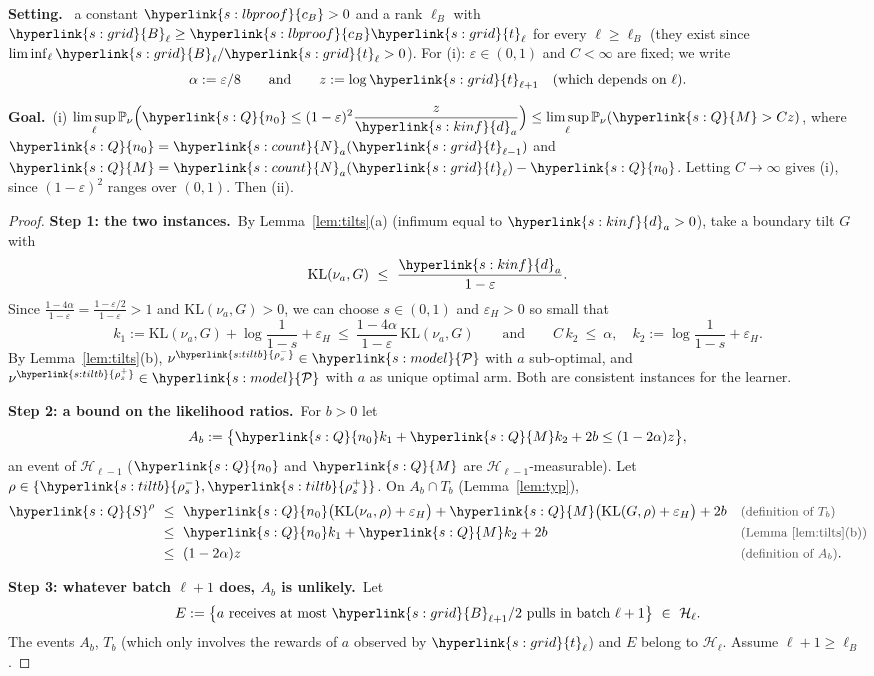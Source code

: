\documentclass[10pt]{article}
\newcommand{\dt}[1]{\hypertarget{#1}{}}
\newcommand{\sy}[2]{{\hyperlink{#1}{#2}}}
\newcommand{\PP}{\mathbb{P}}
\newcommand{\1}{\mathbf{1}}
\newcommand{\KL}{\mathrm{KL}}
\newcommand{\cP}{\sy{s:model}{\mathcal P}}
\newcommand{\da}{\sy{s:kinf}{d}_a}
\newcommand{\Ng}{\sy{s:count}{N}}
\newcommand{\tl}{\sy{s:grid}{t}}
\newcommand{\Bg}{\sy{s:grid}{B}}
\newcommand{\rhom}{\sy{s:tiltb}{\rho^-_s}}
\newcommand{\rhop}{\sy{s:tiltb}{\rho^+_s}}
\newcommand{\nzero}{\sy{s:Q}{n_0}}
\newcommand{\Mb}{\sy{s:Q}{M}}
\newcommand{\Sl}{\sy{s:Q}{S}}
\newcommand{\cB}{\sy{s:lbproof}{c_B}}
\newcommand{\Setting}{\noindent\textbf{Setting.}\ }
\newcommand{\Goal}{\par\smallskip\noindent\textbf{Goal.}\ }
\newcommand{\stp}[2]{\par\medskip\noindent\textbf{Step #1: #2.}\ }
\newcommand{\why}[1]{\text{\small\color{black!70}(#1)}}
\begin{document}
\begin{setgoal}
\Setting\dt{s:lbproof} a constant $\cB>0$ and a rank $\ell_B$ with $\Bg_\ell\ge\cB\tl_\ell$ for every $\ell\ge\ell_B$ (they exist since $\liminf_\ell\Bg_\ell/\tl_\ell>0$).
For (i): $\varepsilon\in(0,1)$ and $C<\infty$ are fixed; we write
\[
\alpha:=\varepsilon/8\qquad\text{and}\qquad z:=\log\tl_{\ell+1}\quad(\text{which depends on }\ell).
\]
\Goal (i) $\displaystyle\limsup_{\ell}\PP_\nu\Big(\nzero\le(1-\varepsilon)^2\frac z{\da}\Big)\le\limsup_\ell\PP_\nu(\Mb>Cz)$, where $\nzero=\Ng_a(\tl_{\ell-1})$ and
$\Mb=\Ng_a(\tl_\ell)-\nzero$. Letting $C\to\infty$ gives (i), since $(1-\varepsilon)^2$ ranges over $(0,1)$. Then (ii).
\end{setgoal}

\begin{proof}
\stp1{the two instances}By Lemma~\ref{lem:tilts}(a) (infimum equal to $\da>0$), take a boundary tilt $G$ with
\[
\KL(\nu_a,G)\ \le\ \frac{\da}{1-\varepsilon}.
\]
Since $\frac{1-4\alpha}{1-\varepsilon}=\frac{1-\varepsilon/2}{1-\varepsilon}>1$ and $\KL(\nu_a,G)>0$, we can choose $s\in(0,1)$ and $\varepsilon_H>0$ so small that
\[
k_1:=\KL(\nu_a,G)+\log\frac1{1-s}+\varepsilon_H\ \le\ \frac{1-4\alpha}{1-\varepsilon}\,\KL(\nu_a,G)
\qquad\text{and}\qquad
C\,k_2\ \le\ \alpha,\quad k_2:=\log\frac1{1-s}+\varepsilon_H .
\]
By Lemma~\ref{lem:tilts}(b), $\nu^{\rhom}\in\cP$ with $a$ sub-optimal, and $\nu^{\rhop}\in\cP$ with $a$ as unique optimal arm. Both are consistent instances for the learner.

\stp2{a bound on the likelihood ratios}For $b>0$ let
\[
A_b:=\big\{\nzero k_1+\Mb k_2+2b\le(1-2\alpha)z\big\},
\]
an event of $\mathcal H_{\ell-1}$ ($\nzero$ and $\Mb$ are $\mathcal H_{\ell-1}$-measurable). Let $\rho\in\{\rhom,\rhop\}$. On $A_b\cap T_b$ (Lemma~\ref{lem:typ}),
\begin{align*}
\Sl^\rho\ &\le\ \nzero\big(\KL(\nu_a,\rho)+\varepsilon_H\big)+\Mb\big(\KL(G,\rho)+\varepsilon_H\big)+2b&&\why{definition of $T_b$}\\
&\le\ \nzero k_1+\Mb k_2+2b&&\why{Lemma~\ref{lem:tilts}(b)}\\
&\le\ (1-2\alpha)z&&\why{definition of $A_b$}.
\end{align*}

\stp3{whatever batch $\ell+1$ does, $A_b$ is unlikely}Let
\[
E:=\big\{a\text{ receives at most }\Bg_{\ell+1}/2\text{ pulls in batch }\ell+1\big\}\ \in\ \mathcal H_\ell .
\]
The events $A_b$, $T_b$ (which only involves the rewards of $a$ observed by $\tl_\ell$) and $E$ belong to $\mathcal H_\ell$. Assume $\ell+1\ge\ell_B$.


\end{proof}
\end{document}
